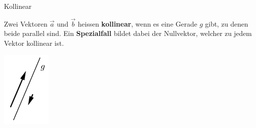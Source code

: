 \begin{definition}{Kollinear}
    
    \begin{minipage}
        {0.85\linewidth}
        Zwei Vektoren $\vec{a}$ und $\vec{b}$ heissen \textbf{kollinear}, 
        wenn es eine Gerade $g$ gibt, zu denen beide parallel sind. 
        Ein \textbf{Spezialfall} bildet dabei der Nullvektor, welcher zu jedem Vektor kollinear ist.
    \end{minipage}
    \hspace{1mm}
    \begin{minipage}{0.1\linewidth}
        \includegraphics[width=\linewidth]{vec-kollinear.png}
    \end{minipage}
\end{definition}

